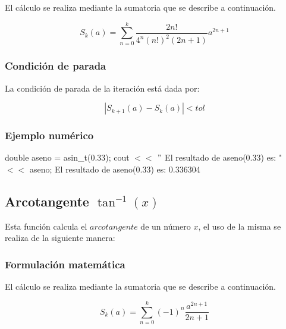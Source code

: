 \documentclass[10pt,a4paper]{article}
\begin{document}
	El cálculo se realiza mediante la sumatoria que se describe a continuación.
	
	\begin{equation}\label{key22}
		S_{k}(a) = \sum_{n=0}^{k}\frac{2n!}{4^{n}(n!)^{2}(2n + 1)}a^{2n+1}
	\end{equation}
	
	\subsubsection{Condición de parada}
	
	La condición de parada de la iteración está dada por: 
	
	\begin{equation}\label{key9}
		\left\lvert S_{k+1}(a) - S_{k}(a) \right\lvert < tol
	\end{equation}
	
	\subsubsection{Ejemplo numérico}

	double aseno = asin{\_}t(0.33); \newline
	cout $<<$ $"$ El resultado de aseno(0.33) es: " $<<$ aseno; \newline
	El resultado de aseno(0.33) es: 0.336304\newline
	
	\subsection{Arcotangente $\tan^{-1}(x)$}
	
	Esta función calcula el $arcotangente$ de un número $x$, el uso de la misma se realiza de la siguiente manera:
	
	\begin{center}
	\end{center}
	
	\subsubsection{Formulación matemática}
	
	El cálculo se realiza mediante la sumatoria que se describe a continuación.
	
	\begin{equation}\label{key22}
		S_{k}(a) = \sum_{n=0}^{k}(-1)^{n}\frac{a^{2n+1}}{2n + 1}
	\end{equation}
	
\end{document}
